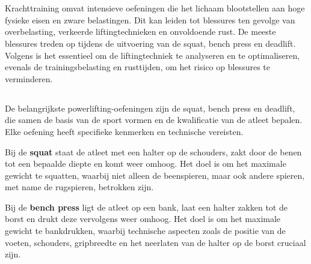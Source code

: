 \chapter{}%
\label{ch:stand-van-zaken}



\section{}%
\label{sec:krachttraining}

Krachttraining omvat intensieve oefeningen die het lichaam blootstellen aan hoge fysieke eisen en zware belastingen. 
Dit kan leiden tot blessures ten gevolge van overbelasting, verkeerde liftingtechnieken en onvoldoende rust.
De meeste blessures treden op tijdens de uitvoering van de squat, bench press en deadlift.  
Volgens \textcite{BengtssonEtAl2018} is het essentieel om de liftingtechniek te analyseren en te optimaliseren, evenals de trainingsbelasting en rusttijden, om het risico op blessures te verminderen.

\section{}%
\label{sec:oefeningen}

De belangrijkste powerlifting-oefeningen zijn de squat, bench press en deadlift, die samen de basis van de sport vormen en de kwalificatie van de atleet bepalen. 
Elke oefening heeft specifieke kenmerken en technische vereisten. 

\medskip

Bij de \textbf{squat} staat de atleet met een halter op de schouders, zakt door de benen tot een bepaalde diepte en komt weer omhoog. 
Het doel is om het maximale gewicht te squatten, waarbij niet alleen de beenspieren, maar ook andere spieren, met name de rugspieren, betrokken zijn. 

\medskip

Bij de \textbf{bench press} ligt de atleet op een bank, laat een halter zakken tot de borst en drukt deze vervolgens weer omhoog.
Het doel is om het maximale gewicht te bankdrukken, waarbij technische aspecten zoals de positie van de voeten, schouders, gripbreedte en het neerlaten van de halter op de borst cruciaal zijn.

